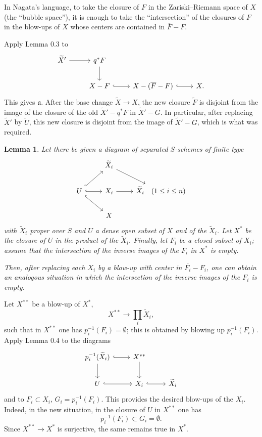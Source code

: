 \documentclass[11pt,a4paper]{article}
\theoremstyle{plain}
\newtheorem{lemma}[theorem]{Lemma}
\theoremstyle{definition}
\begin{document}
In Nagata's language, to take the closure of $F$ in the Zariski--Riemann space of $X$ (the ``bubble space''), it is enough to take the ``intersection'' of the closures of $F$ in the blow-ups of $X$ whose centers are contained in $\overline F-F$.

Apply Lemma 0.3 to
\[
\begin{tikzcd}
\widetilde X' \arrow[r] & q^*F \arrow[d] \\
& X-F \arrow[r,hook] & X-(\overline F-F) \arrow[r,hook] & X .
\end{tikzcd}
\]
This gives $\mathfrak a$. After the base change $\widetilde X\to X$, the new closure $\widetilde F$ is disjoint from the image of the closure of the old $\widetilde X'-q^*F$ in $\widetilde X'-G$. In particular, after replacing $\widetilde X'$ by $\widetilde U$, this new closure is disjoint from the image of $\widetilde X'-G$, which is what was required.

\begin{lemma}
Let there be given a diagram of separated $S$-schemes of finite type
\[
\begin{tikzcd}
& \widetilde X_i \arrow[dr] \\
U \arrow[ur,hook] \arrow[dr,hook] \arrow[r,hook] & X_i \arrow[r] & \widetilde X_i \quad (1\le i\le n) \\
& X
\end{tikzcd}
\]
with $\widetilde X_i$ proper over $S$ and $U$ a dense open subset of $X$ and of the $\widetilde X_i$. Let $X^*$ be the closure of $U$ in the product of the $\widetilde X_i$. Finally, let $F_i$ be a closed subset of $X_i$; assume that the intersection of the inverse images of the $F_i$ in $X^*$ is empty.

Then, after replacing each $X_i$ by a blow-up with center in $\overline{F_i}-F_i$, one can obtain an analogous situation in which the intersection of the inverse images of the $F_i$ is empty.
\end{lemma}

Let $X^{**}$ be a blow-up of $X^*$,
\[
X^{**}\to \prod_i \widetilde X_i,
\]
such that in $X^{**}$ one has $p_i^{-1}(F_i)=\emptyset$; this is obtained by blowing up $p_i^{-1}(F_i)$. Apply Lemma 0.4 to the diagrams
\[
\begin{tikzcd}
p_i^{-1}(\widetilde X_i) \arrow[r,hook] \arrow[d] & X^{**} \arrow[d] \\
U \arrow[r,hook] & X_i \arrow[r,hook] & \widetilde X_i
\end{tikzcd}
\]
and to $F_i\subset X_i$, $G_i=p_i^{-1}(F_i)$. This provides the desired blow-ups of the $X_i$. Indeed, in the new situation, in the closure of $U$ in $X^{**}$ one has
\[
p_i^{-1}(F_i)\subset G_i=\emptyset.
\]
Since $X^{**}\to X^*$ is surjective, the same remains true in $X^*$.
\end{document}
